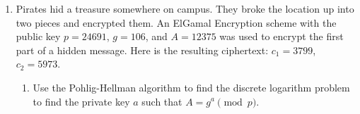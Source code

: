 \documentclass[11pt]{article}
\newcommand{\points}[1]{\marginpar{[#1]}} %
\begin{document}
\vfill

\newpage



\pagestyle{standard}
\begin{enumerate}
    \item Pirates hid a treasure somewhere on campus. They broke the location up into two pieces\points{12} and encrypted them. An ElGamal Encryption scheme with the public key \(p = 24691\), \(g = 106\), and \(A = 12375\) was used to encrypt the first part of a hidden message. Here is the resulting ciphertext: \(c_1 = 3799\), \(c_2 = 5973\).
          \begin{enumerate}
              \item Use the Pohlig-Hellman algorithm to find the discrete logarithm problem to find the private key \(a\) such that \(A = g^a \pmod{p}\).


\end{enumerate}
\end{enumerate}
\end{document}
